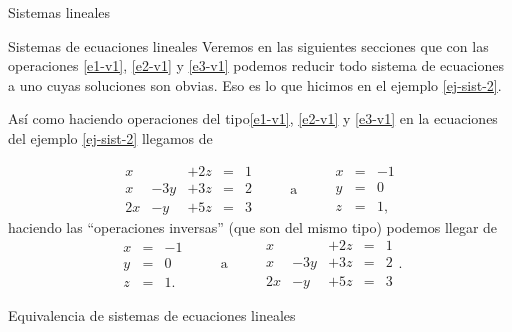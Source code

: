\begin{chapter}{Sistemas lineales}
\begin{section}{Sistemas de ecuaciones lineales}
Veremos en las siguientes secciones que con las operaciones \ref{e1-v1}, \ref{e2-v1} y \ref{e3-v1} podemos reducir todo sistema de ecuaciones a uno cuyas soluciones son obvias. Eso es lo que hicimos en el ejemplo \ref{ej-sist-2}.  
    
    
\begin{ejemplo*}
Así como  haciendo operaciones del tipo\ref{e1-v1}, \ref{e2-v1} y \ref{e3-v1}   en la ecuaciones del ejemplo \ref{ej-sist-2}   llegamos de 
    
    \begin{equation*}
    \begin{matrix}
    x &  & +2z & =& 1 \\
    x& -3y & +3z & =&2 \\
    2x& -y & +5z & =&3
    \end{matrix}
    \qquad \text{ a } 
    \qquad 
    \begin{matrix}x&=&-1\\ y&=&0 \\ z&=&1,
    \end{matrix}
    \end{equation*}
haciendo  las ``operaciones inversas'' (que son del mismo tipo)  podemos llegar de  
\begin{equation*}
\begin{matrix}x&=&-1\\ y&=&0 \\ z&=&1.
\end{matrix}
\qquad \text{ a } 
\qquad 
\begin{matrix}
x &  & +2z & =& 1 \\
x& -3y & +3z & =&2 \\
2x& -y & +5z & =&3
\end{matrix}.
\end{equation*}
\end{ejemplo*}


\end{section}


\begin{section}{Equivalencia de sistemas de ecuaciones lineales}\label{seccion-equivalencia-de-sistemas-de-ecuaciones-lineales}


\end{section}
\end{chapter}
